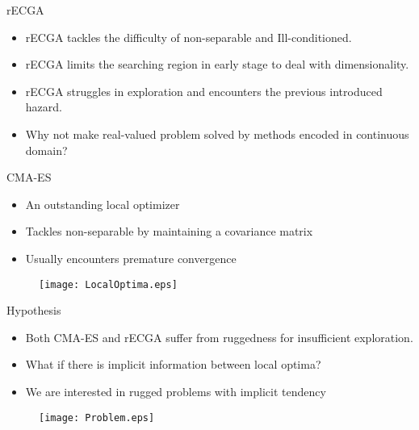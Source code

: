 \begin{frame}{rECGA}
  \begin{itemize}
    \item rECGA tackles the difficulty of
      \alert{non-separable} and \alert{Ill-conditioned}.
      \vspace*{14pt}
    \item rECGA limits the searching region in early stage to deal with
      \alert{dimensionality}.
      \vspace*{14pt}
    \item rECGA struggles in exploration and encounters the previous
      introduced hazard.
      \vspace*{14pt}
    \item Why not make real-valued problem solved by methods encoded in
      continuous domain?

  \end{itemize}
\end{frame}
\begin{frame}{CMA-ES}
  \begin{itemize}
    \item An outstanding local optimizer
    \item Tackles \alert{non-separable} by maintaining a
      covariance matrix
    \item Usually encounters premature convergence
  \end{itemize}
  \begin{figure}[htpb]
    \centering
    \vfill\texttt{[image: LocalOptima.eps]}
  \end{figure}
\end{frame}
\begin{frame}{Hypothesis}
  \begin{itemize}
    \item Both CMA-ES and rECGA suffer from \alert{ruggedness} for
      insufficient exploration.
      \vspace*{8pt}
    \item What if there is implicit information between local optima?
    \item We are interested in rugged problems with implicit tendency
  \end{itemize}
  \vspace*{10pt}
  \begin{figure}[hp]
    \centering
    \texttt{[image: Problem.eps]}
  \end{figure}
\end{frame}

